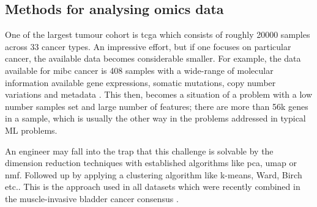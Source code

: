 
\subsection{Methods for analysing omics data} \label{s:lit:multi-omics}

\vspace{3mm}
\vspace{3mm}

One of the largest tumour cohort is \acrshort{tcga}\cite{Tcga2018-sj} which consists of roughly 20000 samples across 33 cancer types. An impressive effort, but if one focuses on particular cancer, the available data becomes considerable smaller. For example, the data available for \acrfull{mibc} cancer is 408 samples with a wide-range of molecular information available gene expressions, somatic mutations, copy number variations and metadata \cite{Robertson2017-mg}. This then, becomes a situation of a problem with a low number samples set and large number of features; there are more than 56k genes in a sample, which is usually the other way in the problems addressed in typical ML problems.

An engineer may fall into the trap that this challenge is solvable by the dimension reduction techniques with established algorithms like \acrfull{pca}, \acrfull{umap} or \acrfull{nmf}. Followed up by applying a clustering algorithm like k-means, Ward, Birch etc.. This is the approach used in all datasets which were recently combined in the muscle-invasive bladder cancer consensus \citet{Kamoun2020-tj}.


